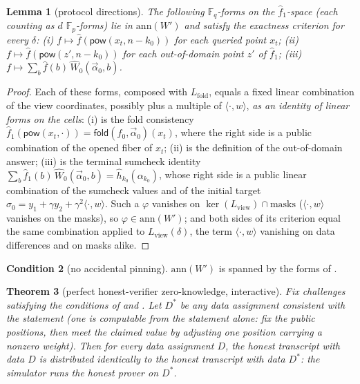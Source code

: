 \documentclass{article}
\newcommand{\Fp}{\mathbb{F}_p}
\newcommand{\Fq}{\mathbb{F}_q}
\newcommand{\extdeg}{d}
\newcommand{\pow}{\mathsf{pow}}
\newcommand{\fold}{\mathsf{fold}}
\newtheorem{theorem}{Theorem}[section]
\newtheorem{lemma}[theorem]{Lemma}
\theoremstyle{definition}
\newtheorem{condition}[theorem]{Condition}
\begin{document}
\begin{lemma}[protocol directions]\label{lem:protocoldirs}
The following $\Fq$-forms on the $\hat{f}_1$-space (each counting as $\extdeg$ $\Fp$-forms) lie in $\mathrm{ann}(W')$ and satisfy the exactness criterion for \emph{every} $\delta$: (i) $f \mapsto \hat{f}(\pow(x_t, n - k_0))$ for each queried point $x_t$; (ii) $f \mapsto \hat{f}(\pow(z', n - k_0))$ for each out-of-domain point $z'$ of $\hat{f}_1$; (iii) $f \mapsto \sum_b \hat{f}(b)\, \hat{W}_0(\vec{\alpha}_0, b)$.
\end{lemma}

\begin{proof}
Each of these forms, composed with $L_{\mathrm{fold}}$, equals a fixed linear combination of the view coordinates, possibly plus a multiple of $\langle \cdot, w \rangle$, \emph{as an identity of linear forms on the cells}: (i) is the fold consistency $\hat{f}_1(\pow(x_t, \cdot)) = \fold(f_0, \vec{\alpha}_0)(x_t)$, where the right side is a public combination of the opened fiber of $x_t$; (ii) is the definition of the out-of-domain answer; (iii) is the terminal sumcheck identity $\sum_b \hat{f}_1(b)\, \hat{W}_0(\vec{\alpha}_0, b) = \hat{h}_{k_0}(\alpha_{k_0})$, whose right side is a public linear combination of the sumcheck values and of the initial target $\sigma_0 = y_1 + \gamma y_2 + \gamma^2 \langle \cdot, w \rangle$. Such a $\varphi$ vanishes on $\ker(L_{\mathrm{view}}) \cap \mathrm{masks}$ ($\langle \cdot, w \rangle$ vanishes on the masks), so $\varphi \in \mathrm{ann}(W')$; and both sides of its criterion equal the same combination applied to $L_{\mathrm{view}}(\delta)$, the term $\langle \cdot, w \rangle$ vanishing on data differences and on masks alike.
\end{proof}

\begin{condition}[no accidental pinning]\label{cond:pinning}
$\mathrm{ann}(W')$ is spanned by the forms of .
\end{condition}

\begin{theorem}[perfect honest-verifier zero-knowledge, interactive]\label{thm:simulator}
Fix challenges satisfying the conditions of  and . Let $D^*$ be any data assignment consistent with the statement (one is computable from the statement alone: fix the public positions, then meet the claimed value by adjusting one position carrying a nonzero weight). Then for every data assignment $D$, the honest transcript with data $D$ is distributed identically to the honest transcript with data $D^*$: the simulator runs the honest prover on $D^*$.
\end{theorem}
\end{document}
